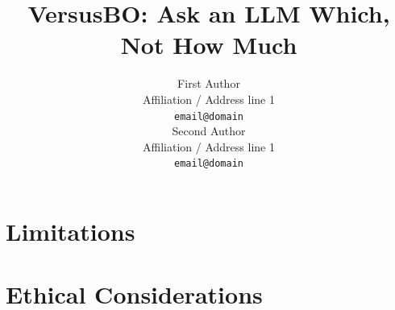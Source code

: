 \documentclass[11pt]{article}
\title{VersusBO: Ask an LLM Which, Not How Much}
\author{First Author \\
  Affiliation / Address line 1 \\
  \texttt{email@domain} \\\And
  Second Author \\
  Affiliation / Address line 1 \\
  \texttt{email@domain} \\}
\begin{document}
\maketitle
\begin{abstract}

\end{abstract}









\section*{Limitations}


\section*{Ethical Considerations}




\appendix

\end{document}

